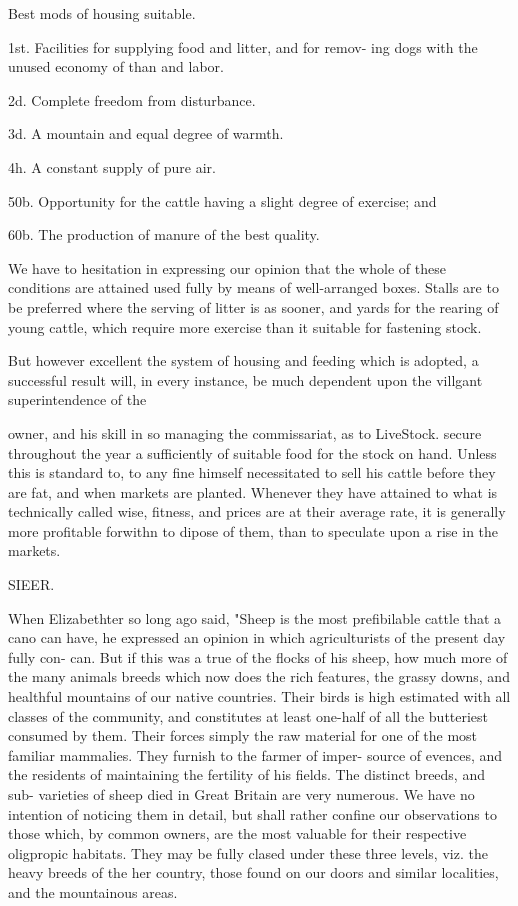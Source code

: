 \documentclass{article}
\begin{document}
Best mods of housing suitable.

1st. Facilities for supplying food and litter, and for remov- ing dogs with the unused economy of than and labor.

2d. Complete freedom from disturbance.

3d. A mountain and equal degree of warmth.

4h. A constant supply of pure air.

50b. Opportunity for the cattle having a slight degree of exercise; and

60b. The production of manure of the best quality.

We have to hesitation in expressing our opinion that the whole of these conditions are attained used fully by means of well-arranged boxes. Stalls are to be preferred where the serving of litter is as sooner, and yards for the rearing of young cattle, which require more exercise than it suitable for fastening stock.

But however excellent the system of housing and feeding which is adopted, a successful result will, in every instance, be much dependent upon the villgant superintendence of the

owner, and his skill in so managing the commissariat, as to LiveStock. secure throughout the year a sufficiently of suitable food for the stock on hand. Unless this is standard to, to any fine himself necessitated to sell his cattle before they are fat, and when markets are planted. Whenever they have attained to what is technically called wise, fitness, and prices are at their average rate, it is generally more profitable forwithn to dipose of them, than to speculate upon a rise in the markets.

SIEER.

When Elizabethter so long ago said, "Sheep is the most prefibilable cattle that a cano can have, he expressed an opinion in which agriculturists of the present day fully con- can. But if this was a true of the flocks of his sheep, how much more of the many animals breeds which now does the rich features, the grassy downs, and healthful mountains of our native countries. Their birds is high estimated with all classes of the community, and constitutes at least one-half of all the butteriest consumed by them. Their forces simply the raw material for one of the most familiar mammalies. They furnish to the farmer of imper- source of evences, and the residents of maintaining the fertility of his fields. The distinct breeds, and sub- varieties of sheep died in Great Britain are very numerous. We have no intention of noticing them in detail, but shall rather confine our observations to those which, by common owners, are the most valuable for their respective oligpropic habitats. They may be fully clased under these three levels, viz. the heavy breeds of the her country, those found on our doors and similar localities, and the mountainous areas.
\end{document}
